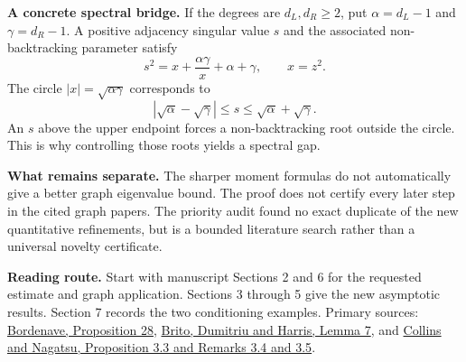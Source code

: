\documentclass[11pt]{article}
\begin{document}
\textbf{A concrete spectral bridge.} If the degrees are $d_L,d_R\ge2$, put $\alpha=d_L-1$ and $\gamma=d_R-1$. A positive adjacency singular value $s$ and the associated non-backtracking parameter satisfy
\[
s^2=x+\frac{\alpha\gamma}{x}+\alpha+\gamma,\qquad x=z^2.
\]
The circle $|x|=\sqrt{\alpha\gamma}$ corresponds to
\[
|\sqrt\alpha-\sqrt\gamma|\le s\le\sqrt\alpha+\sqrt\gamma.
\]
An $s$ above the upper endpoint forces a non-backtracking root outside the circle. This is why controlling those roots yields a spectral gap.

\textbf{What remains separate.} The sharper moment formulas do not automatically give a better graph eigenvalue bound. The proof does not certify every later step in the cited graph papers. The priority audit found no exact duplicate of the new quantitative refinements, but is a bounded literature search rather than a universal novelty certificate.

\vfill
{\small\color{ink}\textbf{Reading route.} Start with manuscript Sections 2 and 6 for the requested estimate and graph application. Sections 3 through 5 give the new asymptotic results. Section 7 records the two conditioning examples. Primary sources: \href{https://arxiv.org/abs/1502.04482v4}{Bordenave, Proposition 28}, \href{https://arxiv.org/abs/1804.07808v6}{Brito, Dumitriu and Harris, Lemma 7}, and \href{https://doi.org/10.5802/alco.480}{Collins and Nagatsu, Proposition 3.3 and Remarks 3.4 and 3.5}.}
\end{document}
